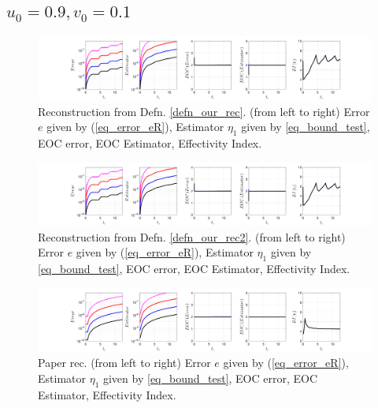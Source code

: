 \documentclass[12pt,a4paper]{article}
\numberwithin{equation}{section}
\theoremstyle{definition}
\begin{document}
\subsection*{$u_0=0.9, v_0= 0.1$}
\begin{figure}[H]
	\hspace{-3cm}
	\includegraphics[scale=0.55]{fig_LeapFrogplots_1x5_sin_IC_harmonic_order_2_u9_v1_rec_george}	
	\caption{Reconstruction from Defn. \ref{defn_our_rec}. (from left to right) Error $e$ given by (\ref{eq_error_eR}), Estimator $\eta_1$ given by \ref{eq_bound_test},  EOC error, EOC Estimator, Effectivity Index.}
	\label{fig_all_in_one_our_rec_george_u9_v1}
\end{figure}
\begin{figure}[H]
	\hspace{-3cm}
	\includegraphics[scale=0.55]{fig_LeapFrogplots_1x5_sin_IC_harmonic_order_2_u9_v1_rec2}	
	\caption{Reconstruction from Defn. \ref{defn_our_rec2}. (from left to right) Error $e$ given by (\ref{eq_error_eR}), Estimator $\eta_1$ given by \ref{eq_bound_test},  EOC error, EOC Estimator, Effectivity Index.}
	\label{fig_all_in_one_our_rec_2_u9_v1}
\end{figure}
\begin{figure}[H]
	\hspace{-3cm}
	\includegraphics[scale=0.55]{fig_LeapFrogplots_1x5_sin_IC_harmonic_u9_v1_paperrec}	
	\caption{Paper rec. (from left to right) Error $e$ given by (\ref{eq_error_eR}), Estimator $\eta_1$ given by \ref{eq_bound_test},   EOC error, EOC Estimator, Effectivity Index.}
	\label{fig_all_in_one_paperrec_u09_v01}
\end{figure}
\end{document}
